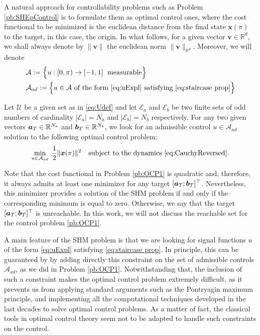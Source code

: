 \documentclass[twocolumn]{autart}    %
\begin{document}
A natural approach for controllability problems such as Problem \ref{pb:SHEpControl} is to formulate them as optimal control ones, where the cost functional to be minimized is the euclidean distance from the final state $\bm{x}(\pi)$ to the target, in this case, the origin. In what follows, for a given vector $\bm{v}\in\mathbb{R}^d$, we shall always denote by $\|\bm{v}\|$ the euclidean norm $\|\bm{v}\|_{\mathbb{R}^d}$. Moreover, we will denote
\begin{align*}
	&\mathcal A:= \Big\{u:[0,\pi)\to [-1,1]\; \text{ measurable}\Big\}
	\\
	&\mathcal A_{ad}:= \Big\{u\in\mathcal A \text{ of the form } \eqref{eq:uExpl} \text{ satisfying } \eqref{eq:staircase prop}\Big\}
\end{align*}


\begin{problem}\label{pb:OCP1}
Let $\mathcal{U}$ be a given set as in \eqref{eq:Udef} and let $\mathcal{E}_a $ and $\mathcal{E} _b $ be two finite sets of odd numbers of cardinality $|\mathcal{E}_a| = N_a $ and $ |\mathcal{E} _b| = N_b$ respectively. For any two given vectors $\bm{a}_T \in \mathbb{R}^{N_a}$ and $\bm{b}_T \in \mathbb{R}^{N_b} $, we look for an admissible control $u\in \mathcal{A}_{ad}$ solution to the following optimal control problem:
\begin{equation*}
	\min_{u \in \mathcal{A}_{ad}}\;\frac 12 \|\bm{x}(\pi)\|^2 \quad \text{subject to the dynamics \eqref{eq:CauchyReversed}}.
\end{equation*}
\end{problem}

\begin{remark}
Note that the cost functional in Problem \ref{pb:OCP1} is quadratic and, therefore, it always admits at least one minimizer for any target $[\bm{a}_T;\bm{b}_T]^\top$. Nevertheless, this minimizer provides a solution of the SHM problem if and only if the corresponding minimum is equal to zero. Otherwise, we say that the target $[\bm{a}_T;\bm{b}_T]^\top$ is unreachable. In this work, we will not discuss the reachable set for the control problem \eqref{pb:OCP1}.
\end{remark}

A main feature of the SHM problem is that we are looking for signal functions $u$ of the form \eqref{eq:uExpl} satisfying \eqref{eq:staircase prop}. In principle, this can be guaranteed by by adding directly this constraint on the set of admissible controls $\mathcal{A}_{ad}$, as we did in Problem \ref{pb:OCP1}. Notwithstanding that, the inclusion of such a constraint makes the optimal control problem extremely difficult, as it prevents us from applying standard arguments such as the Pontryagin maximum principle, and implementing all the computational techniques developed in the last decades to solve optimal control problems. As a matter of fact, the classical tools in optimal control theory seem not to be adapted to handle such constraints on the control. 
\end{document}
